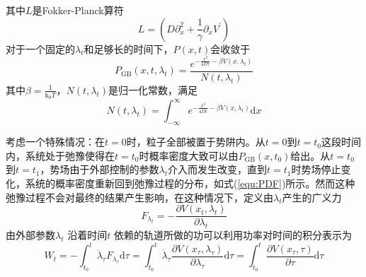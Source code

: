 其中$L$是Fokker-Planck算符
\begin{equation}
L=\left(D \partial_{x}^{2}+\frac{1}{\gamma} \partial_{x} V^{\prime}\right)
\label{equ:FPoper}
\end{equation}
对于一个固定的$\lambda_t$和足够长的时间下，$P(x,t)$会收敛于
\begin{equation}
P_{\mathrm{GB}}\left(x, t, \lambda_{t}\right)=\frac{e^{-\frac{x^{2}}{4 D \tau}-\beta V\left(x, \lambda_{t}\right)}}{N\left(t, \lambda_{t}\right)}
\label{equ:PDF}
\end{equation}
其中$\beta=\frac{1}{\mathrm{k}_{0}T}$，$N(t,\lambda_t)$是归一化常数，满足
\begin{equation}
N\left(t, \lambda_{t}\right)=\int_{-\infty}^{\infty} e^{-\frac{x^{2}}{4 D t}-\beta V\left(x, \lambda_{t}\right)} \mathrm{d} x
\end{equation}

考虑一个特殊情况：在$t=0$时，粒子全部被置于势阱内。从$t=0$到$t=t_0$这段时间内，系统处于弛豫使得在$t=t_0$时概率密度大致可以由$P_{\mathrm{GB}}(x,t_0)$给出。从$t=t_0$到$t=t_1$，势场由于外部控制的参数$\lambda_t$介入而发生改变，直到$t=t_1$时势场停止变化，系统的概率密度重新回到弛豫过程的分布，如式(\ref{equ:PDF})所示。然而这种弛豫过程不会对最终的结果产生影响，在这种情况下，定义由$\lambda_t$产生的广义力\cite{streissnigWorkFluctuationTheorem2021}
\begin{equation}
F_{\lambda_t}=-\frac{\partial V(x_t,\lambda_t)}{\partial\lambda_t}
\end{equation}
由外部参数$\lambda_t$ 沿着时间$t$ 依赖的轨道所做的功可以利用功率对时间的积分表示为
\begin{equation}
W_{t}=-\int_{t_{0}}^{t} \dot{\lambda}_{\tau}F_{\lambda_{\tau}}\mathrm{d} \tau=\int_{t_{0}}^{t} \dot{\lambda}_{\tau} \frac{\partial V\left(x_{\tau}, \lambda_{\tau}\right)}{\partial \lambda_{\tau}} \mathrm{d} \tau=\int_{t_{0}}^{t} \frac{\partial V\left(x_{\tau}, \tau\right)}{\partial \tau} \mathrm{d} \tau
\label{equ:Wt}
\end{equation}

